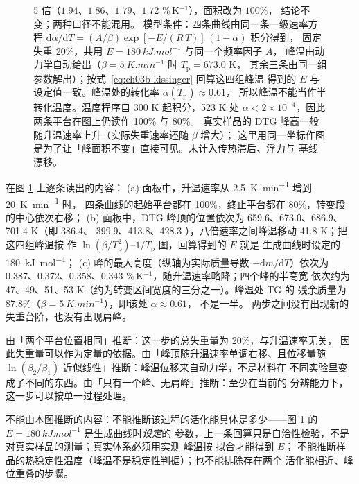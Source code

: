 \begin{figure}[tbp]
{$5$ 倍（$1.94$、$1.86$、$1.79$、$1.72$ \%\,K$^{-1}$），面积改为 $100\%$，
结论不变；两种口径不能混用。
模型条件：四条曲线由同一条一级速率方程
$\mathrm{d}\alpha/\mathrm{d}T=(A/\beta)\exp[-E/(R\,T)]\,(1-\alpha)$ 积分得到，
固定失重 20\%，共用 $E=\qty{180}{kJ.mol^{-1}}$ 与同一个频率因子 $A$，
峰温由动力学自动给出（$\beta=\qty{5}{K.min^{-1}}$ 时 $T_{\mathrm p}=673.0$ K，
其余三条由同一组参数解出）；按式~\eqref{eq:ch03b-kissinger} 回算这四组峰温
得到的 $E$ 与设定值一致。峰温处的转化率 $\alpha(T_{\mathrm p})\approx0.61$，
所以峰温不能当作半转化温度。温度程序自 300 K 起积分，523 K 处
$\alpha<2\times10^{-4}$，因此两条平台在图上仍读作 100\% 与 80\%。
真实样品的 DTG 峰高一般随升温速率上升（实际失重速率还随 $\beta$ 增大）；
这里用同一坐标作图是为了让「峰面积不变」直接可见。未计入传热滞后、浮力与
基线漂移。
}
\label{fig:ch03b-rate}
\end{figure}

\begin{example}[读图：升温速率改变的是峰温还是峰面积]
\begin{obs}
在图 \ref{fig:ch03b-rate} 上逐条读出的内容：
(a) 面板中，升温速率从 \qty{2.5}{K.min^{-1}} 增到 \qty{20}{K.min^{-1}} 时，
四条曲线的起始平台都在 100\%，终止平台都在 80\%，转变段的中心依次右移；
(b) 面板中，DTG 峰顶的位置依次为 659.6、673.0、686.9、701.4 K（即 386.4、
399.9、413.8、428.3 \degC），八倍速率之间峰温移动 41.8 K；把这四组峰温按
 作
$\ln(\beta/T_{\mathrm p}^{2})$--$1/T_{\mathrm p}$ 图，回算得到的 $E$ 就是
生成曲线时设定的 \qty{180}{kJ.mol^{-1}}；
(c) 峰的最大高度（纵轴为实际质量导数 $-\mathrm{d}m/\mathrm{d}T$）依次为
0.387、0.372、0.358、0.343 \%\,K$^{-1}$，随升温速率略降；四个峰的半高宽
依次约为 47、49、51、53 K（约为转变区间宽度的三分之一）。峰温处 TG 的
残余质量为 87.8\%（$\beta=\qty{5}{K.min^{-1}}$），即该处 $\alpha\approx0.61$，
不是一半。
两步之间没有出现新的失重台阶，也没有出现肩峰。
\end{obs}
\begin{infer}
由「两个平台位置相同」推断：这一步的总失重量为 20\%，与升温速率无关，
因此失重量可以作为定量的依据。由「峰顶随升温速率单调右移、且位移量随
$\ln(\beta_2/\beta_1)$ 近似线性」推断：峰温位移来自动力学，不是材料在
不同实验里变成了不同的东西。由「只有一个峰、无肩峰」推断：至少在当前的
分辨能力下，这一步可以按单一过程处理。

不能由本图推断的内容：不能推断该过程的活化能具体是多少——图
\ref{fig:ch03b-rate} 的 $E=\qty{180}{kJ.mol^{-1}}$ 是生成曲线时\emph{设定}的
参数，上一条回算只是自洽性检验，不是对真实样品的测量；真实体系必须用实测
峰温按 拟合才能得到 $E$；
不能推断样品的热稳定性温度（峰温不是稳定性判据）；也不能排除存在两个
活化能相近、峰位重叠的步骤。
\end{infer}
\end{example}

